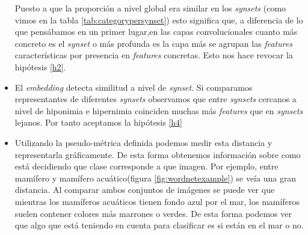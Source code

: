 \documentclass[12,twoside]{TFG-GM}
\theoremstyle{definition}
\theoremstyle{remark}
\begin{document}
\begin{itemize}
Puesto a que la proporción a nivel global era similar en los \textit{synsets} (como vimos en la tabla \ref{tab:categorypersynset}) esto significa que, a diferencia de lo que pensábamos en un primer lugar,en las capas convolucionales cuanto más concreto es el \textit{synset} o más profunda es la capa más se agrupan las \textit{features} características por presencia en \textit{features} concretas. Esto nos hace revocar la hipótesis \ref{h2}.


\item El \textit{embedding} detecta similitud a nivel de \textit{synset}. Si comparamos representantes de diferentes \textit{synsets} observamos que entre \textit{synsets} cercanos a nivel de hiponimia e hipernimia coinciden muchas más \textit{features} que en \textit{synsets} lejanos. Por tanto aceptamos la hipótesis \ref{h4}
\item Utilizando la pseudo-métrica definida podemos medir esta distancia y representarla gráficamente. De esta forma obtenemos información sobre como está decidiendo que clase corresponde a que imagen. Por ejemplo, entre mamífero y mamífero acuático(figura \ref{fig:wordnetexample}) se veía una gran distancia. Al comparar ambos conjuntos de imágenes se puede ver que mientras los mamíferos acuáticos tienen fondo azul por el mar, los mamíferos suelen contener colores más marrones o verdes. De esta forma podemos ver que algo que está teniendo en cuenta para clasificar es si están en el mar o no.
\end{itemize}
\end{document}
